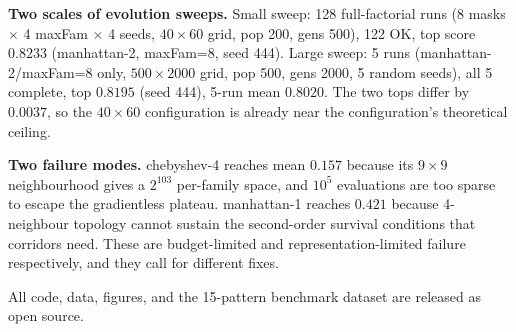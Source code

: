 \noindent\textbf{Two scales of evolution sweeps.} Small sweep: 128 full-factorial runs (8 masks $\times$ 4 maxFam $\times$ 4 seeds, $40{\times}60$ grid, pop 200, gens 500), 122 OK, top score $0.8233$ (manhattan-2, maxFam=8, seed 444). Large sweep: 5 runs (manhattan-2/maxFam=8 only, $500{\times}2000$ grid, pop 500, gens 2000, 5 random seeds), all 5 complete, top $0.8195$ (seed 444), 5-run mean $0.8020$. The two tops differ by $0.0037$, so the $40{\times}60$ configuration is already near the configuration's theoretical ceiling.

\noindent\textbf{Two failure modes.} chebyshev-4 reaches mean $0.157$ because its $9{\times}9$ neighbourhood gives a $2^{103}$ per-family space, and $10^5$ evaluations are too sparse to escape the gradientless plateau. manhattan-1 reaches $0.421$ because 4-neighbour topology cannot sustain the second-order survival conditions that corridors need. These are budget-limited and representation-limited failure respectively, and they call for different fixes.

\noindent All code, data, figures, and the 15-pattern benchmark dataset are released as open source.
